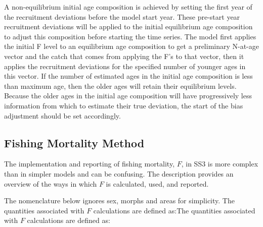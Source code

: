 
A non-equilibrium initial age composition is achieved by setting the first year of the recruitment deviations before the model start year. These pre-start year recruitment deviations will be applied to the initial equilibrium age composition to adjust this composition before starting the time series. The model first applies the initial F level to an equilibrium age composition to get a preliminary N-at-age vector and the catch that comes from applying the F's to that vector, then it applies the recruitment deviations for the specified number of younger ages in this vector. If the number of estimated ages in the initial age composition is less than maximum age, then the older ages will retain their equilibrium levels. Because the older ages in the initial age composition will have progressively less information from which to estimate their true deviation, the start of the bias adjustment should be set accordingly.

\subsection{Fishing Mortality Method}
The implementation and reporting of fishing mortality, $F$, in SS3 is more complex than in simpler models and can be confusing. The description provides an overview of the ways in which $F$ is calculated, used, and reported.


The nomenclature below ignores sex, morphs and areas for simplicity. The quantities associated with $F$ calculations are defined as:The quantities associated with $F$ calculations are defined as:

